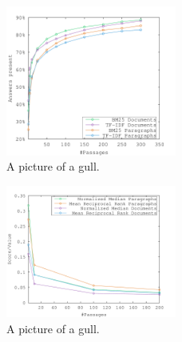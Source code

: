 
\begin{figure}[h!]
  \centering
  \includegraphics[width=0.5\textwidth]{figures/bm25_tfdf.pdf}
  \caption{A picture of a gull.}
\end{figure}

\begin{figure}[h!]
  \centering
  \includegraphics[width=0.5\textwidth]{figures/median.pdf}
  \caption{A picture of a gull.}
\end{figure}
